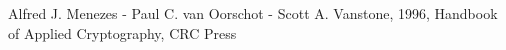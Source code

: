 \documentclass[12pt, oneside]{book}
\begin{document}
\thispagestyle{empty}
\nocite{*}
\clearpage


 

\begin{thebibliography}{1}

 Alfred J. Menezes - Paul C. van Oorschot - Scott A. Vanstone, 1996, Handbook of Applied Cryptography, CRC Press
 





\end{thebibliography}



%
%
%
%
\end{document}
